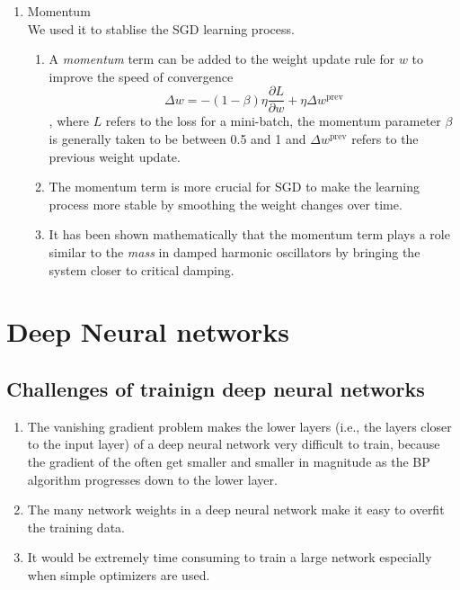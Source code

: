 \documentclass[11pt]{article}
\newcommand\pddx[2]{\frac{\partial{#1}}{\partial{#2}}}
\begin{document}
\begin{enumerate}
\item Momentum\\
We used it to stablise the SGD learning process.
\begin{enumerate}
    \item A \emph{momentum} term can be added to the weight update rule for $w$ to improve the speed of convergence $$\Delta w = - (1-\beta) \eta \pddx{L}{w} + \eta \Delta w^{\text{prev}}$$, where $L$ refers to the loss for a mini-batch, the momentum parameter $\beta$ is generally taken to be between 0.5 and 1 and $\Delta w^{\text{prev}}$ refers to the previous weight update.
    \begin{center}
    \end{center}
    \item The momentum term is more crucial for SGD to make the learning process more stable by smoothing the weight changes over time.
    \item It has been shown mathematically that the momentum term plays a role similar to the \emph{mass} in damped harmonic oscillators by bringing the system closer to critical damping.
\end{enumerate}
\end{enumerate}

\section{Deep Neural networks}
\subsection{Challenges of trainign deep neural networks}
\begin{enumerate}
    \item The vanishing gradient problem makes the lower layers (i.e., the layers closer to the input layer) of a deep neural network very difficult to train, because the gradient of the often get smaller and smaller in magnitude as the BP algorithm progresses down to the lower layer.
    \item The many network weights in a deep neural network make it easy to overfit the training data.
    \item It would be extremely time consuming to train a large network especially when simple optimizers are used.
\end{enumerate}
\end{document}
